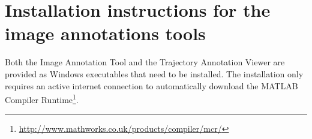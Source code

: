 \chapter{Installation instructions for the image annotations tools}
	\label{app:annotationtool}
	\label{app:interactiveviewer}
	
	Both the Image Annotation Tool and the Trajectory Annotation Viewer are provided as Windows executables that need to be installed. The installation only requires an active internet connection to automatically download the MATLAB Compiler Runtime\footnote{\url{http://www.mathworks.co.uk/products/compiler/mcr/}}.